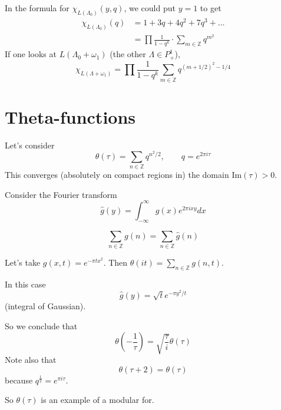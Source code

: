 \begin{remark}
\label{remark-duplicate-2}
In the formula for
$\chi_{L(\Lambda_0)}(y,q)$,
we could put $y=1$ to get
$$
\begin{aligned}
\chi_{L(\Lambda_0)}(q)&=1+3q+4q^2+7q^3+
\ldots\\
&=\prod\frac{1}{1-q^k}\cdot \sum_{m \in
\mathbb{Z}}q^{m^2}
\end{aligned}
$$
If one looks at $L(\Lambda_0+\omega_1)$ (the
other $\Lambda \in P_+^1$),
$$
\chi_{L(\Lambda+\omega_1)}=\prod
\frac{1}{1-q^k}
\sum_{m \in \mathbb{Z}}q^{(m+1/2)^2-1/4}
$$
\end{remark}

\section{Theta-functions}
\label{section-theta-functions}

\noindent
Let's consider
$$
\theta(\tau)=\sum_{n \in
\mathbb{Z}}q^{n^2/2},\qquad q=e^{2\pi i \tau}
$$
This converges (absolutely on compact regions
in)
the domain $\text{Im}(\tau)>0$.

Consider the Fourier transform
$$
\hat{g}(y)=\int_{-\infty}^\infty g(x)e^{2\pi
ixy}dx
$$

\begin{theorem}
\label{theorem-Poisson-summation}
 $$
\sum_{n \in \mathbb{Z}}g(n)=\sum_{n \in
\mathbb{Z}}\hat{g}(n)
$$
\end{theorem}

Let's take $g(x,t)=e^{-\pi tx^2}$.
Then $\theta(it)=\sum_{n\in
\mathbb{Z}}g(n,t)$.

In this case
$$
\hat{g}(y)=\sqrt{t}e^{-\pi y^2/t}
$$
(integral of Gaussian).

So we conclude that
$$
\theta\left(-\frac{1}{\tau}\right)=
\sqrt{\frac{\tau}{i}}\theta(\tau)
$$
Note also that
$$
\theta(\tau+2)=\theta(\tau)
$$
because $q^{\frac{1}{2}}=e^{\pi i\tau}$.

So $\theta(\tau)$ is an example of a modular
for.

